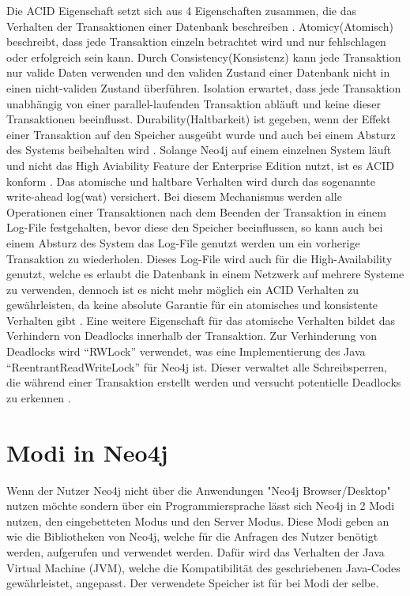 Die ACID Eigenschaft setzt sich aus 4 Eigenschaften zusammen, die das Verhalten der Transaktionen einer  Datenbank beschreiben \parencite{haerder1983principles}. Atomicy(Atomisch) beschreibt, dass jede Transaktion einzeln betrachtet wird und nur fehlschlagen oder erfolgreich sein kann. Durch Consistency(Konsistenz) kann jede Transaktion nur valide Daten verwenden und den validen Zustand einer Datenbank nicht in einen nicht-validen Zustand überführen. Isolation erwartet, dass jede Transaktion unabhängig von einer parallel-laufenden Transaktion abläuft und keine dieser Transaktionen beeinflusst. Durability(Haltbarkeit) ist gegeben, wenn der Effekt einer Transaktion auf den Speicher ausgeübt wurde und auch bei einem Absturz des Systems beibehalten wird \parencite{haerder1983principles}. Solange Neo4j auf einem einzelnen System läuft und nicht das High Aviability Feature der Enterprise Edition nutzt, ist es ACID konform \parencite{holzschuher2013performance}. Das atomische und haltbare Verhalten wird durch das sogenannte write-ahead log(wat) versichert. Bei diesem Mechanismus  werden alle Operationen einer Transaktionen nach dem Beenden der Transaktion in einem Log-File  festgehalten, bevor diese  den Speicher beeinflussen, so kann auch bei einem Absturz des System das Log-File genutzt werden um ein vorherige Transaktion zu wiederholen.  Dieses Log-File wird auch für die High-Availability  genutzt, welche es erlaubt die Datenbank in einem Netzwerk auf mehrere Systeme zu verwenden, dennoch ist es nicht mehr möglich ein  ACID Verhalten zu gewährleisten, da keine absolute Garantie für ein  atomisches und konsistente Verhalten gibt \parencite{vukotic2015neo4j}. Eine weitere Eigenschaft für das atomische Verhalten bildet das Verhindern von Deadlocks innerhalb der Transaktion. Zur Verhinderung von Deadlocks wird “RWLock” verwendet, was eine Implementierung des Java “ReentrantReadWriteLock” für Neo4j ist. Dieser verwaltet alle Schreibsperren, die während einer Transaktion erstellt werden und versucht potentielle Deadlocks zu erkennen \parencite{raj2015neo4j}.
\section {Modi in Neo4j}
Wenn der Nutzer Neo4j nicht über die Anwendungen "Neo4j Browser/Desktop" nutzen möchte sondern über ein Programmiersprache  lässt sich Neo4j in 2 Modi nutzen, den eingebetteten Modus und den Server Modus. Diese Modi geben an wie die Bibliotheken von Neo4j, welche für die Anfragen des Nutzer benötigt werden, aufgerufen und verwendet werden. Dafür wird das Verhalten der Java Virtual Machine (JVM), welche die Kompatibilität des geschriebenen Java-Codes gewährleistet, angepasst. Der verwendete Speicher ist für bei Modi der selbe.

